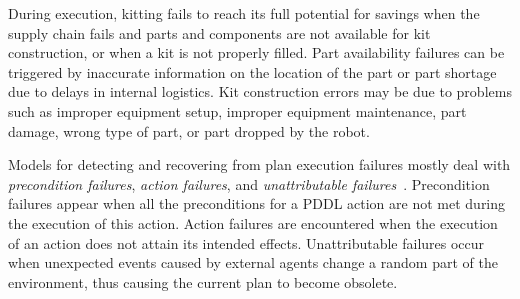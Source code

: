 During execution, kitting fails to reach its full potential for savings when the supply chain fails and parts and components are not available for kit construction, or when a kit is not properly filled. Part availability failures can be triggered by inaccurate information on the location of the part or part shortage due to delays in internal logistics. Kit construction errors may be due to problems such as improper equipment setup, improper equipment maintenance, part damage, wrong type of part, or part dropped by the robot.


Models for detecting and recovering from plan execution failures mostly deal with \textit{precondition failures}, \textit{action failures}, and \textit{unattributable failures}~\cite{Myers1998}. Precondition failures appear when all the preconditions for a PDDL action are not met during the execution of this action. Action failures are encountered when the execution of an action does not attain its intended effects. Unattributable failures occur when unexpected events caused by external agents change a random part of the environment, thus causing the current plan to become obsolete.

